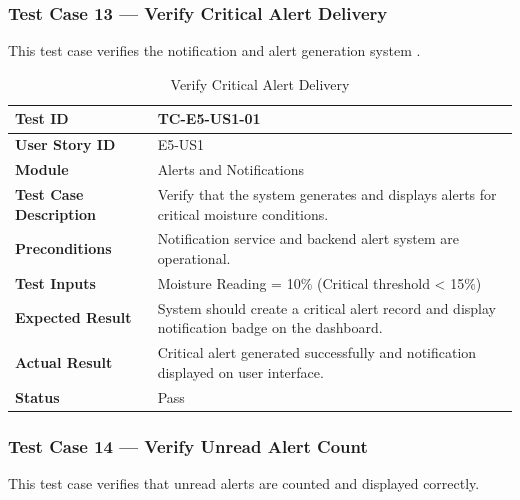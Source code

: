 \subsubsection{Test Case 13 --- Verify Critical Alert Delivery}

This test case verifies the notification and alert generation 
system \cite{khawas2018firebase}.

\begin{longtable}{|p{4cm}|p{8cm}|}
\caption{Verify Critical Alert Delivery}
\label{tab:tc_alert} \\
\hline
\textbf{Test ID} & TC-E5-US1-01 \\ \hline
\textbf{User Story ID} & E5-US1 \\ \hline
\textbf{Module} & Alerts and Notifications \\ \hline
\textbf{Test Case Description} & Verify that the system generates 
and displays alerts for critical moisture conditions. \\ \hline
\textbf{Preconditions} & Notification service and backend alert 
system are operational. \\ \hline
\textbf{Test Inputs} & Moisture Reading = 10\% (Critical threshold 
< 15\%) \\ \hline
\textbf{Expected Result} & System should create a critical alert 
record and display notification badge on the dashboard. \\ \hline
\textbf{Actual Result} & Critical alert generated successfully and 
notification displayed on user interface. \\ \hline
\textbf{Status} & Pass \\ \hline
\end{longtable}

\subsubsection{Test Case 14 --- Verify Unread Alert Count}

This test case verifies that unread alerts are counted and displayed 
correctly.


